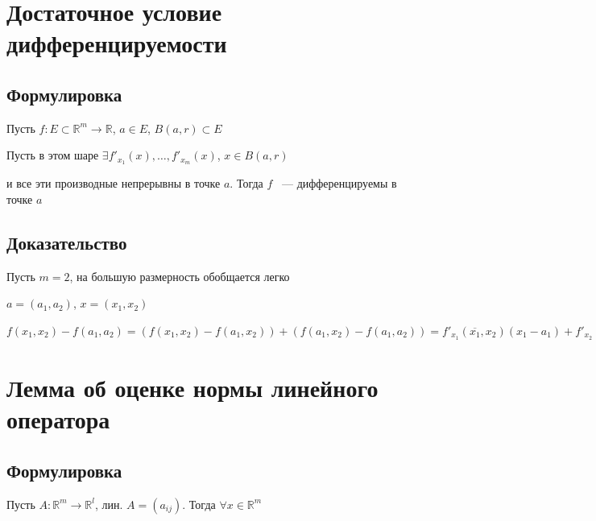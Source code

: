 \documentclass{article}
\begin{document}
    \newpage
    
    \section{Достаточное условие дифференцируемости}
    
        \subsection{Формулировка}
        
            Пусть $f : E \subset \mathbb{R}^m \rightarrow \mathbb{R}$, $a \in E$, $B(a, r) \subset E$
            
            Пусть в этом шаре $\exists f'_{x_1} (x), \ldots, f'_{x_m} (x)$, $x \in B(a, r)$
            
            и все эти производные непрерывны в точке $a$. Тогда $f$ ~--- дифференцируемы в точке $a$
            
        \subsection{Доказательство}
        
            Пусть $m = 2$, на большую размерность обобщается легко
            
            $a = (a_1, a_2)$, $x = (x_1, x_2)$
            
            $f(x_1, x_2) - f(a_1, a_2) = \left( f(x_1, x_2) - f(a_1, x_2) \right) + \left(f(a_1, x_2) - f(a_1, a_2) \right) = f'_{x_1} (\overline{x_1}, x_2)(x_1 - a_1) + f'_{x_2}(x_1, \overline{x_2})(x_2 - a_2) = f'_{x_1}(a_1, a_2)(x_1 - a_1) + f'_{x_2} (a_1, a_2)(x_2 - a_2) + (f'_{x_1}(\overline{x_1}, x_2) - f'_{x_1}(a_1, a_2))(x_1 - a_1) + (f'_{x_2}(a, \overline{x_2}) - f'_{x_2}(a_1, a_2)(x_2 - a_2)$
            
    \newpage
    
    \section{Лемма об оценке нормы линейного оператора}
    
        \subsection{Формулировка}
        
            Пусть $A : \mathbb{R}^m \rightarrow \mathbb{R}^l$, лин. $A = (a_{ij})$. Тогда $\forall x \in \mathbb{R}^m$
            
\end{document}
